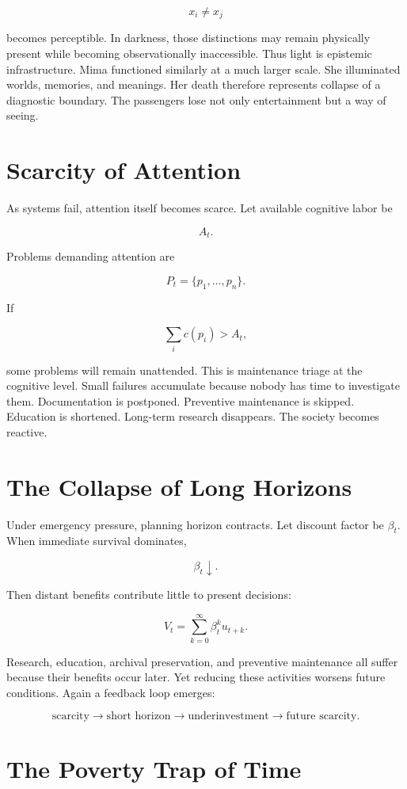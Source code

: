 \documentclass[11pt,oneside]{book}
\theoremstyle{definition}
\theoremstyle{remark}
\begin{document}
\[
x_i\neq x_j
\]

becomes perceptible. In darkness, those distinctions may remain physically present while becoming
observationally inaccessible. Thus light is epistemic infrastructure. Mima functioned similarly at a
much larger scale. She illuminated worlds, memories, and meanings. Her death therefore represents
collapse of a diagnostic boundary. The passengers lose not only entertainment but a way of seeing.

\section{Scarcity of Attention}

As systems fail, attention itself becomes scarce. Let available cognitive labor be

\[
A_t.
\]

Problems demanding attention are

\[
P_t=\{p_1,\ldots,p_n\}.
\]

If

\[
\sum_i c(p_i)>A_t,
\]

some problems will remain unattended. This is maintenance triage at the cognitive level. Small
failures accumulate because nobody has time to investigate them. Documentation is postponed.
Preventive maintenance is skipped. Education is shortened. Long-term research disappears. The
society becomes reactive.

\section{The Collapse of Long Horizons}

Under emergency pressure, planning horizon contracts. Let discount factor be \(\beta_t\). When
immediate survival dominates,

\[
\beta_t\downarrow.
\]

Then distant benefits contribute little to present decisions:

\[
V_t = \sum_{k=0}^{\infty} \beta_t^k u_{t+k}.
\]

Research, education, archival preservation, and preventive maintenance all suffer because their
benefits occur later. Yet reducing these activities worsens future conditions. Again a feedback loop
emerges:

\[
\text{scarcity} \rightarrow \text{short horizon} \rightarrow \text{underinvestment} \rightarrow \text{future scarcity}.
\]

\section{The Poverty Trap of Time}
\end{document}
